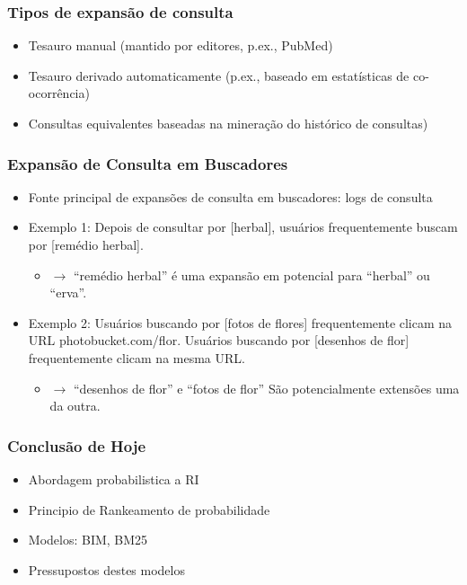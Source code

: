 \documentclass[compress]{beamer}
\def\myblue#1{\textcolor{texblue}{#1}}
\begin{document}
\begin{frame}
\frametitle{Tipos de expansão de consulta}
\begin{itemize}
\item Tesauro manual (mantido por editores, p.ex., PubMed)
\item Tesauro derivado automaticamente (p.ex., baseado em estatísticas de 
co-ocorr\^encia)
\item Consultas equivalentes baseadas na minera\c{c}\~ao do hist\'orico de 
consultas)
\end{itemize}
\end{frame}

\begin{frame}
\frametitle{Expansão de Consulta em Buscadores}
\begin{itemize}
\item Fonte principal de expansões de consulta em buscadores: logs de consulta
\item Exemplo 1: Depois de consultar por [herbal], usuários frequentemente buscam por [remédio herbal].
\begin{itemize}
\item $\rightarrow$ 
``remédio herbal'' é uma expansão em potencial para ``herbal'' ou ``erva''.
\end{itemize}

\item Exemplo 2: Usuários buscando por [fotos de flores] frequentemente clicam na URL \myblue{photobucket.com/flor}. 
Usuários buscando por [desenhos de flor]
  frequentemente clicam na \myblue{mesma URL}.
\begin{itemize}
\item $\rightarrow$ 
``desenhos de flor'' e ``fotos de flor'' São potencialmente extensões uma da outra.
\end{itemize}

\end{itemize}
\end{frame}


\begin{frame}
\frametitle{Conclusão de Hoje}
\begin{itemize}
\item Abordagem probabilistica a RI
\item Principio de Rankeamento de probabilidade
\item Modelos: BIM, BM25
\item Pressupostos destes modelos
\end{itemize}
\end{frame}
\end{document}
